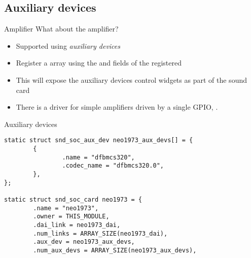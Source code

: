 \subsection{Auxiliary devices}

\begin{frame}{Amplifier}
  What about the amplifier?
  \begin{itemize}
  \item Supported using {\em auxiliary devices}
  \item Register a  array using the
     and  fields of the registered
  \item This will expose the auxiliary devices control widgets as part
    of the sound card
  \item There is a driver for simple amplifiers driven by a single
    GPIO, .
  \end{itemize}
\end{frame}

\begin{frame}[fragile]{Auxiliary devices}
  \begin{block}{}
    \fontsize{9}{9}\selectfont
    \begin{verbatim}
static struct snd_soc_aux_dev neo1973_aux_devs[] = {
        {
                .name = "dfbmcs320",
                .codec_name = "dfbmcs320.0",
        },
};

static struct snd_soc_card neo1973 = {
        .name = "neo1973",
        .owner = THIS_MODULE,
        .dai_link = neo1973_dai,
        .num_links = ARRAY_SIZE(neo1973_dai),
        .aux_dev = neo1973_aux_devs,
        .num_aux_devs = ARRAY_SIZE(neo1973_aux_devs),
    \end{verbatim}
  \end{block}
\end{frame}

